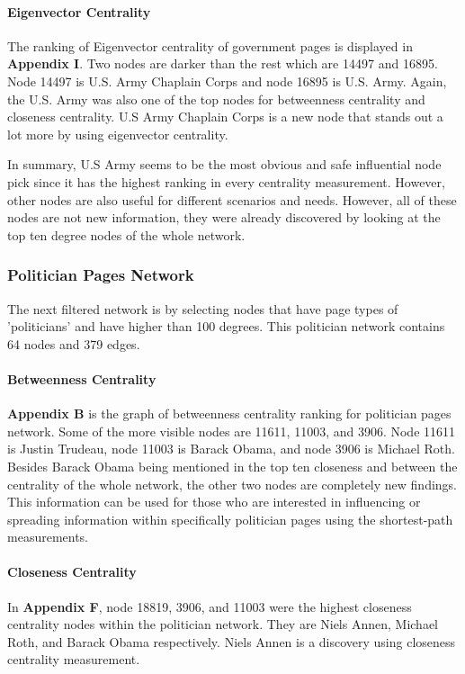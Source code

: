 \documentclass[11pt,twocolumn]{article}
\begin{document}
\paragraph{Eigenvector Centrality}
The ranking of Eigenvector centrality of government pages is displayed in \textbf{Appendix I}. Two nodes are darker than the rest which are 14497 and 16895. Node 14497 is U.S. Army Chaplain Corps and node 16895 is U.S. Army. Again, the U.S. Army was also one of the top nodes for betweenness centrality and closeness centrality. U.S Army Chaplain Corps is a new node that stands out a lot more by using eigenvector centrality.

In summary, U.S Army seems to be the most obvious and safe influential node pick since it has the highest ranking in every centrality measurement. However, other nodes are also useful for different scenarios and needs. However, all of these nodes are not new information, they were already discovered by looking at the top ten degree nodes of the whole network.

\subsubsection{Politician Pages Network}
The next filtered network is by selecting nodes that have page types of 'politicians' and have higher than 100 degrees. This politician network contains 64 nodes and 379 edges. 
\paragraph{Betweenness Centrality}
\textbf{Appendix B} is the graph of betweenness centrality ranking for politician pages network. Some of the more visible nodes are  11611, 11003, and 3906. Node 11611 is Justin Trudeau, node 11003 is Barack Obama, and node 3906 is Michael Roth. Besides Barack Obama being mentioned in the top ten closeness and between the centrality of the whole network, the other two nodes are completely new findings. This information can be used for those who are interested in influencing or spreading information within specifically politician pages using the shortest-path measurements. 

\paragraph{Closeness Centrality}
In \textbf{Appendix F}, node 18819, 3906, and 11003 were the highest closeness centrality nodes within the politician network. They are Niels Annen, Michael Roth, and Barack Obama respectively. Niels Annen is a discovery using closeness centrality measurement.
 
\end{document}
